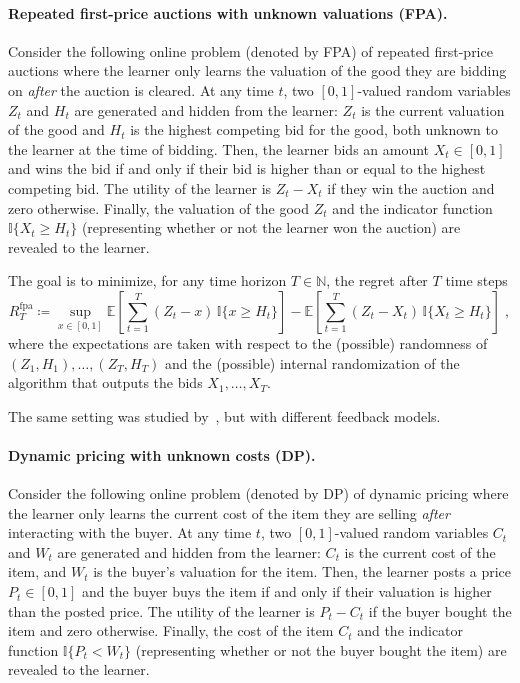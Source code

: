 \documentclass[final,12pt]{colt2025}
\newcommand{\E}{\mathbb{E}}
\newcommand{\N}{\mathbb{N}}
\newcommand{\lsb}[1]{\left[#1\right]}
\newcommand{\one}[1]{\mathbb{I}\{#1\}}
\newcommand{\ceq}{\coloneqq}
\newcommand{\Rfpa}{R^{\mathrm{fpa}}}
\newcommand{\nX}{X}
\newcommand{\nx}{x}
\newcommand{\nV}{Z}
\newcommand{\nM}{H}
\newcommand{\nC}{C}
\newcommand{\nW}{W}
\newcommand{\nY}{P}
\begin{document}
\paragraph{Repeated first-price auctions with unknown valuations (FPA).}
Consider the following online problem (denoted by FPA) of repeated first-price auctions where the learner only learns the valuation of the good they are bidding on \emph{after} the auction is cleared. 
At any time $t$, two $[0,1]$-valued random variables $\nV_t$ and $\nM_t$ are generated and hidden from the learner: $\nV_t$ is the current valuation of the good and $\nM_t$ is the highest competing bid for the good, both unknown to the learner at the time of bidding.
Then, the learner bids an amount $\nX_t \in [0,1]$ and wins the bid if and only if their bid is higher than or equal to the highest competing bid. 
The utility of the learner is $\nV_t - \nX_t$ if they win the auction and zero otherwise.
Finally, the valuation of the good $\nV_t$ and the indicator function $\one{ \nX_t \ge \nM_t }$ (representing whether or not the learner won the auction) are revealed to the learner.

The goal is to minimize, for any time horizon $T\in\N$, the regret after $T$ time steps
\[
    \Rfpa_T
\ceq
    \sup_{\nx \in [0,1] } 
    \E\lsb{ \sum_{t=1}^T (\nV_t - \nx)\,\one{\nx \ge \nM_t } }
    -
    \E\lsb{ \sum_{t=1}^T (\nV_t - \nX_t)\,\one{\nX_t \ge \nM_t } } \;,
\]
where the expectations are taken with respect to the (possible) randomness of $(\nV_1, \nM_1), \dots, (\nV_T, \nM_T)$ and the (possible) internal randomization of the algorithm that outputs the bids $\nX_1, \dots, \nX_T$.


The same setting was studied by~\citet{cesabianchiRoleTransparencyRepeated2024}, but with different feedback models.


\paragraph{Dynamic pricing with unknown costs (DP).}

Consider the following online problem (denoted by DP) of dynamic pricing where the learner only learns the current cost of the item they are selling \emph{after} interacting with the buyer. 
At any time $t$, two $[0,1]$-valued random variables $\nC_t$ and $\nW_t$ are generated and hidden from the learner: $\nC_t$ is the current cost of the item, and $\nW_t$ is the buyer's valuation for the item.
Then, the learner posts a price $\nY_t \in [0,1]$ and the buyer buys the item if and only if their valuation is higher than the posted price. 
The utility of the learner is $\nY_t - \nC_t$ if the buyer bought the item and zero otherwise.
Finally, the cost of the item $\nC_t$ and the indicator function $\one{\nY_t < \nW_t }$ (representing whether or not the buyer bought the item) are revealed to the learner.
\end{document}
